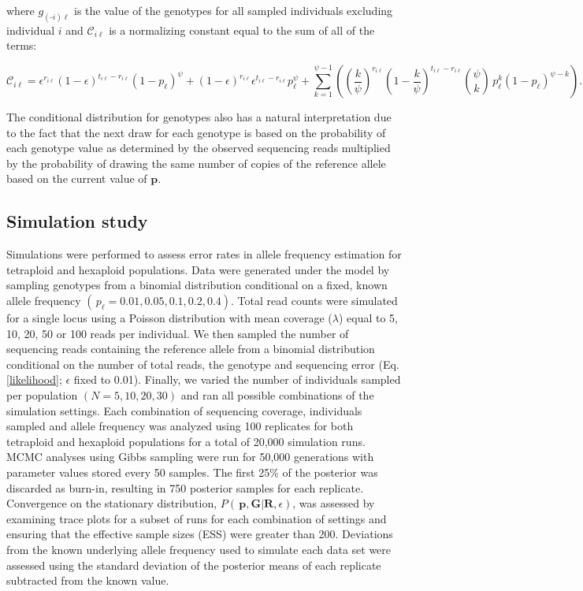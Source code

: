 \documentclass[11pt,english,letterpaper,oneside]{article}
\begin{document}
\noindent where $g_{(\text{-}i) \ell}$ is the value of the genotypes for all sampled individuals excluding individual $i$ and $\mathcal{C}_{i \ell}$ is a normalizing constant equal to the sum of all of the terms:

\begin{equation*}
\mathcal{C}_{i \ell} = \epsilon^{r_{i \ell}}(1-\epsilon)^{t_{i \ell}-r_{i \ell}}(1-p_{\ell})^\psi + (1-\epsilon)^{r_{i \ell}}\epsilon^{t_{i \ell}-r_{i \ell}}p_{\ell}^\psi + \sum_{k=1}^{\psi-1}\left(\left(\frac{k}{\psi}\right)^{r_{i \ell}}\left(1-\frac{k}{\psi}\right)^{t_{i \ell}-r_{i \ell}}\binom{\psi}{k}\,p_{\ell}^k(1-p_{\ell})^{\psi-k}\right).
\end{equation*}

The conditional distribution for genotypes also has a natural interpretation due to the fact that the next draw for each genotype is based on the probability of each genotype value as determined by the observed sequencing reads multiplied by the probability of drawing the same number of copies of the reference allele based on the current value of $\bm{p}$.

\medskip
\subsection*{Simulation study}
\medskip

Simulations were performed to assess error rates in allele frequency estimation for tetraploid and hexaploid populations. Data were generated under the model by sampling genotypes from a binomial distribution conditional on a fixed, known allele frequency $(\,p_{\ell} = 0.01, 0.05, 0.1, 0.2, 0.4)$. Total read counts were simulated for a single locus using a Poisson distribution with mean coverage ($\lambda$) equal to 5, 10, 20, 50 or 100 reads per individual. We then sampled the number of sequencing reads containing the reference allele from a binomial distribution conditional on the number of total reads, the genotype and sequencing error (Eq. \ref{likelihood}; $\epsilon$ fixed to 0.01). Finally, we varied the number of individuals sampled per population $(N = 5, 10, 20, 30)$ and ran all possible combinations of the simulation settings. Each combination of sequencing coverage, individuals sampled and allele frequency was analyzed using 100 replicates for both tetraploid and hexaploid populations for a total of  20,000 simulation runs. MCMC analyses using Gibbs sampling were run for 50,000 generations with parameter values stored every 50 samples. The first 25\% of the posterior was discarded as burn-in, resulting in 750 posterior samples for each replicate. Convergence on the stationary distribution, $P(\,\bm{p},\bm{G}|\bm{R},\epsilon)$, was assessed by examining trace plots for a subset of runs for each combination of settings and ensuring that the effective sample sizes (ESS) were greater than 200. Deviations from the known underlying allele frequency used to simulate each data set were assessed using the standard deviation of the posterior means of each replicate subtracted from the known value.
\medskip
\end{document}
